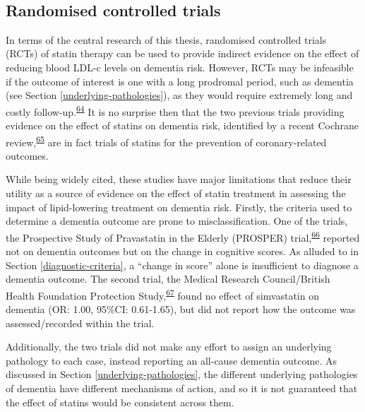 \documentclass[a4paper, twoside]{templates/ociamthesis}
\begin{document}
~

\hypertarget{randomised-controlled-trials}{%
\subsection{Randomised controlled trials}\label{randomised-controlled-trials}}

In terms of the central research of this thesis, randomised controlled trials (RCTs) of statin therapy can be used to provide indirect evidence on the effect of reducing blood LDL-c levels on dementia risk. However, RCTs may be infeasible if the outcome of interest is one with a long prodromal period, such as dementia (see Section \ref{underlying-pathologies}), as they would require extremely long and costly follow-up.\textsuperscript{\protect\hyperlink{ref-ritchie2015}{64}} It is no surprise then that the two previous trials providing evidence on the effect of statins on dementia risk, identified by a recent Cochrane review,\textsuperscript{\protect\hyperlink{ref-mcguinness2016}{65}} are in fact trials of statins for the prevention of coronary-related outcomes.

While being widely cited, these studies have major limitations that reduce their utility as a source of evidence on the effect of statin treatment in assessing the impact of lipid-lowering treatment on dementia risk. Firstly, the criteria used to determine a dementia outcome are prone to misclassification. One of the trials, the Prospective Study of Pravastatin in the Elderly (PROSPER) trial,\textsuperscript{\protect\hyperlink{ref-trompet2010}{66}} reported not on dementia outcomes but on the change in cognitive scores. As alluded to in Section \ref{diagnostic-criteria}, a ``change in score'' alone is insufficient to diagnose a dementia outcome. The second trial, the Medical Research Council/British Health Foundation Protection Study,\textsuperscript{\protect\hyperlink{ref-heartprotectionstudycollaborativegroup2002}{67}} found no effect of simvastatin on dementia (OR: 1.00, 95\%CI: 0.61-1.65), but did not report how the outcome was assessed/recorded within the trial.

Additionally, the two trials did not make any effort to assign an underlying pathology to each case, instead reporting an all-cause dementia outcome. As discussed in Section \ref{underlying-pathologies}, the different underlying pathologies of dementia have different mechanisms of action, and so it is not guaranteed that the effect of statins would be consistent across them.
\end{document}
